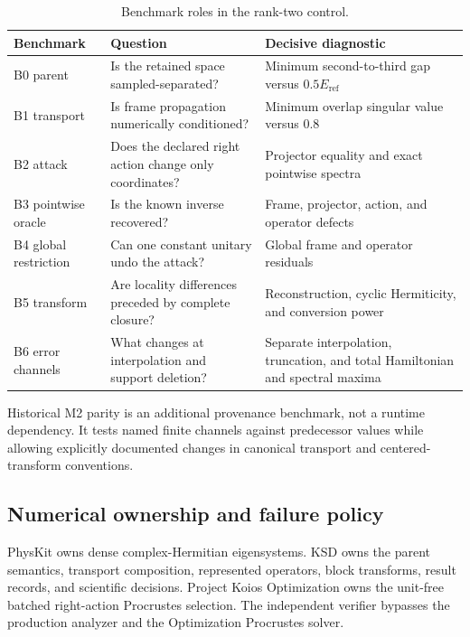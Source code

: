 \documentclass[11pt]{article}
\newcommand{\eref}{E_{\mathrm{ref}}}
\begin{document}
\begin{table}[htbp]
\centering
\caption{Benchmark roles in the rank-two control.}
\label{tab:benchmarks}
\small
\begin{tabular}{@{}L{0.12\textwidth}L{0.34\textwidth}L{0.43\textwidth}@{}}
\toprule
Benchmark & Question & Decisive diagnostic \\
\midrule
B0 parent & Is the retained space sampled-separated? & Minimum second-to-third gap versus $0.5\eref$ \\
B1 transport & Is frame propagation numerically conditioned? & Minimum overlap singular value versus $0.8$ \\
B2 attack & Does the declared right action change only coordinates? & Projector equality and exact pointwise spectra \\
B3 pointwise oracle & Is the known inverse recovered? & Frame, projector, action, and operator defects \\
B4 global restriction & Can one constant unitary undo the attack? & Global frame and operator residuals \\
B5 transform & Are locality differences preceded by complete closure? & Reconstruction, cyclic Hermiticity, and conversion power \\
B6 error channels & What changes at interpolation and support deletion? & Separate interpolation, truncation, and total Hamiltonian and spectral maxima \\
\bottomrule
\end{tabular}
\end{table}

Historical M2 parity is an additional provenance benchmark, not a runtime dependency.
It tests named finite channels against predecessor values while allowing explicitly
documented changes in canonical transport and centered-transform conventions.

\subsection{Numerical ownership and failure policy}

PhysKit owns dense complex-Hermitian eigensystems.  KSD owns the parent semantics,
transport composition, represented operators, block transforms, result records, and
scientific decisions.  Project Koios Optimization owns the unit-free batched right-action
Procrustes selection.  The independent verifier bypasses the production analyzer and the
Optimization Procrustes solver.
\end{document}
